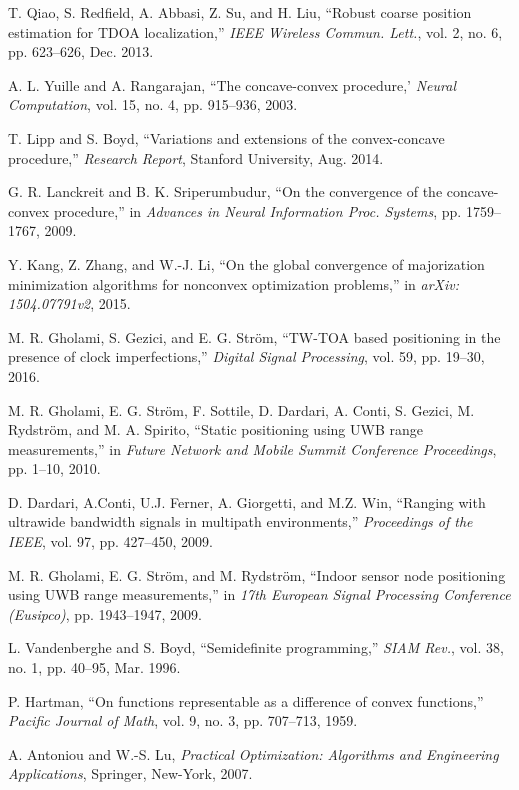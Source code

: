 \begin{thebibliography}{99}
T. Qiao, S. Redfield, A. Abbasi, Z. Su, and H. Liu, ``Robust coarse position estimation for TDOA localization,'' {\em IEEE Wireless Commun. Lett.}, vol. 2, no. 6, pp. 623--626, Dec. 2013.

A. L. Yuille and A. Rangarajan, ``The concave-convex procedure,' {\em Neural Computation}, vol. 15, no. 4, pp. 915--936, 2003.

T. Lipp and S. Boyd, ``Variations and extensions of the convex-concave procedure,'' {\em Research Report}, Stanford University, Aug. 2014.

G. R. Lanckreit and B. K. Sriperumbudur, ``On the convergence of the concave-convex procedure,'' in  {\em Advances in Neural Information Proc. Systems}, pp. 1759--1767, 2009.

Y. Kang, Z. Zhang, and W.-J. Li, ``On the global convergence of majorization minimization algorithms for nonconvex optimization problems,'' in {\em arXiv:
1504.07791v2}, 2015.

M. R. Gholami, S. Gezici, and E. G. Str\"om, ``TW-TOA based positioning in the presence of clock imperfections,'' {\em  Digital Signal Processing}, vol. 59, pp. 19--30, 2016.

M. R. Gholami, E. G. Str\"om, F. Sottile, D. Dardari, A. Conti, S. Gezici, M. Rydstr\"om, and M. A. Spirito, ``Static positioning using UWB range measurements,'' in {\em Future Network and Mobile Summit Conference Proceedings}, %
pp. 1--10, 2010.

D. Dardari, A.Conti, U.J. Ferner, A. Giorgetti, and M.Z. Win, ``Ranging with ultrawide bandwidth signals in multipath environments,'' {\em Proceedings of the IEEE}, vol. 97, pp. 427--450, 2009.

M. R. Gholami, E. G. Str\"om, and M. Rydstr\"om, ``Indoor sensor node positioning using UWB range measurements,'' in {\em 17th European Signal Processing Conference (Eusipco)}, pp. 1943--1947, 2009.

 \label{r12}
L. Vandenberghe and S. Boyd, ``Semidefinite programming,'' {\em SIAM Rev.}, vol. 38, no. 1, pp. 40--95, Mar. 1996.

P. Hartman, ``On functions representable as a difference of convex functions,'' {\em Pacific Journal of Math}, vol. 9, no. 3, pp. 707--713, 1959.

A. Antoniou and W.-S. Lu, {\em Practical Optimization: Algorithms and Engineering Applications}, Springer, New-York, 2007.


\end{thebibliography}
